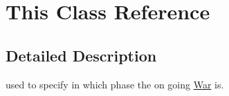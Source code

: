 \hypertarget{class_this}{}\section{This Class Reference}
\label{class_this}


\subsection{Detailed Description}
used to specify in which phase the on going \mbox{\hyperlink{class_war}{War}} is. 
